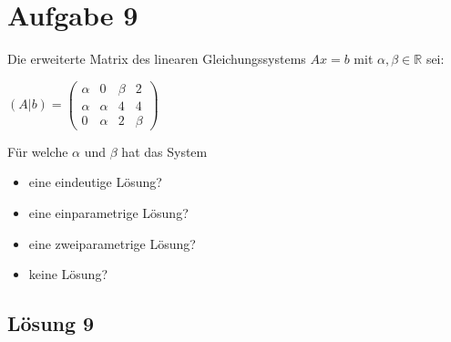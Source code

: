 \section{Aufgabe 9}

Die erweiterte Matrix des linearen Gleichungssystems $\displaystyle Ax=b$ mit $\displaystyle \alpha ,\beta \in \mathbb{R}$ sei:


$\displaystyle ( A|b) =\begin{pmatrix}
	\alpha  & 0 & \beta  & 2\\
	\alpha  & \alpha  & 4 & 4\\
	0 & \alpha  & 2 & \beta 
\end{pmatrix}$



Für welche $\displaystyle \alpha $ und $\displaystyle \beta $ hat das System
\begin{itemize}
	\item eine eindeutige Lösung?
	\item eine einparametrige Lösung?
	\item eine zweiparametrige Lösung?
	\item keine Lösung?
\end{itemize}



\subsection{Lösung 9}

